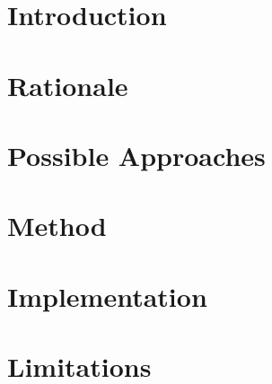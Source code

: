 \section{Introduction}
\label{sec:rebuilding:introduction}



\section{Rationale}



\section{Possible Approaches}


\section{Method}


\section{Implementation}


\section{Limitations}



